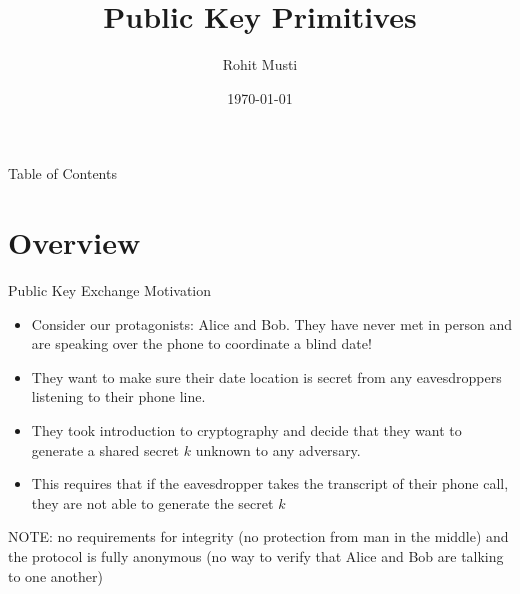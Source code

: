 \documentclass[]{beamer}
\title{Public Key Primitives}
\author{Rohit Musti}
\institute{CUNY - Hunter College}
\date{\today}
\begin{document}
 
\frame{\titlepage}

\begin{frame}{Table of Contents}
  \tableofcontents
\end{frame}


\section{Overview}

\begin{frame}{Public Key Exchange Motivation}
    \begin{itemize}
        \item \pause Consider our protagonists: Alice and Bob. They have never met in person and are speaking over the phone to coordinate a blind date!
        \item \pause They want to make sure their date location is secret from any eavesdroppers listening to their phone line.
        \item \pause They took introduction to cryptography and decide that they want to generate a shared secret \(k\) unknown to any adversary.
        \item \pause This requires that if the eavesdropper takes the transcript of their phone call, they are not able to generate the secret \(k\) 
    \end{itemize}
    \pause NOTE: no requirements for integrity (no protection from man in the middle) and the protocol is fully anonymous (no way to verify that Alice and Bob are talking to one another)
\end{frame}
\end{document}
